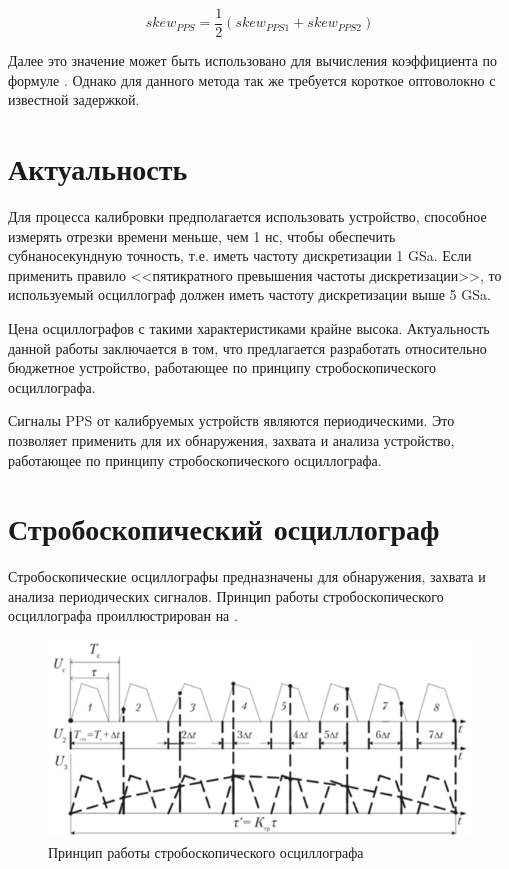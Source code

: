\begin{equation}
	\label{eq:skew_mean}
	skew_{PPS} = \frac{1}{2} \left(skew_{PPS1} + skew_{PPS2} \right)
\end{equation}

Далее это значение может быть использовано для вычисления коэффициента по формуле . Однако для данного метода так же требуется
короткое оптоволокно с известной задержкой.

\section{Актуальность}

Для процесса калибровки предполагается использовать устройство, способное измерять отрезки времени меньше, чем 1 нс, чтобы обеспечить
субнаносекундную точность, т.е. иметь частоту дискретизации 1 GSa. Если применить правило <<пятикратного превышения частоты дискретизации>>, то
используемый осциллограф должен иметь частоту дискретизации выше 5 GSa. 

Цена осциллографов с такими характеристиками крайне высока. Актуальность данной работы заключается в том, что предлагается разработать
относительно бюджетное устройство, работающее по принципу стробоскопического осциллографа.
 
Сигналы PPS от калибруемых устройств являются периодическими. Это позволяет применить для их обнаружения, захвата и анализа устройство,
работающее по принципу стробоскопического осциллографа.

\section{Стробоскопический осциллограф}

Стробоскопические осциллографы предназначены для обнаружения, захвата и анализа периодических сигналов.
Принцип работы стробоскопического осциллографа проиллюстрирован на .

\begin{figure}[ht!] 
	\center
	\includegraphics {my_folder/images//stb_osc}
	\caption{Принцип работы стробоскопического осциллографа} 
	\label{fig:stb-osc}  
\end{figure}
\newpage

